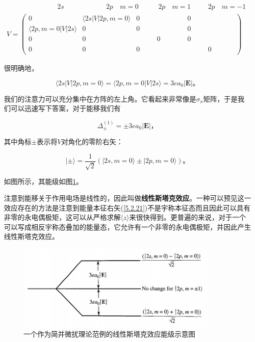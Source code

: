 ﻿\documentclass[UTF8,twoside]{ctexart}
\begin{document}
\begin{equation} \label{5.2.18}
\begin{split}
\phantom{V=(\langle 2p,m)\quad}  2s\phantom{|V|2s\rangle\quad\langle 2s|\quad}2p\quad m=0\phantom{0\rangle\qquad}2p\quad m=1\phantom{a\qquad}2p\quad m=-1 \ \ \ \ \  \\
V=\left(\begin{array}{cccc}
0 & \langle 2s|V|2p,m=0\rangle & 0 & 0 \\
\langle 2p,m=0|V|2s\rangle & 0 & 0 & 0 \\
0 & 0 & \phantom{\langle 2s|V|2}0\phantom{,m=0} & 0 \\
0 & 0 & 0 & \phantom{\langle 2s|V|2}0\phantom{,m=0}
\end{array}\right)
\end{split}
\end{equation}

\noindent 很明确地，

\begin{equation} \label{5.2.19}
\langle 2s|V|2p,m=0\rangle = \langle 2p,m=0|V|2s\rangle = 3ea_0|{\boldsymbol{E}}|\text{。}
\end{equation}

\noindent 我们的注意力可以充分集中在方阵的左上角。它看起来非常像是$\sigma_x$矩阵，于是我们可以迅速写下答案，对于能移我们有

\begin{equation} \label{5.2.20}
\Delta_\pm^{(1)}=\pm 3ea_0|{\boldsymbol{E}}|\text{，}
\end{equation}

\noindent 其中角标$\pm$表示将$V$对角化的零阶右矢：

\begin{equation} \label{5.2.21}
|\pm\rangle=\dfrac{1}{\sqrt{2}}(|2s,m=0\rangle\pm|2p,m=0\rangle)\text{。}
\end{equation}

\noindent 如图所示，其能级如图{\ref{Figure 5.1}}。

注意到能移关于作用电场是线性的，因此叫做\textbf{线性斯塔克效应}。一种可以预见这一效应存在的方法是注意到能量本征右矢(\ref{5.2.21})不是宇称本征态而且因此可以具有非零的永电偶极矩，这可以从严格求解$\langle z\rangle$来很快得到。更普遍的来说，对于一个可以写成相反宇称态叠加的能量态，它允许有一个非零的永电偶极矩，并因此产生线性斯塔克效应。

\begin{figure}
\begin{centering}
\includegraphics[width = 10cm]{./Graph/5.1.jpg}
\caption{一个作为简并微扰理论范例的线性斯塔克效应能级示意图}
\label {Figure 5.1}
\end{centering}
\end{figure}
\end{document}
